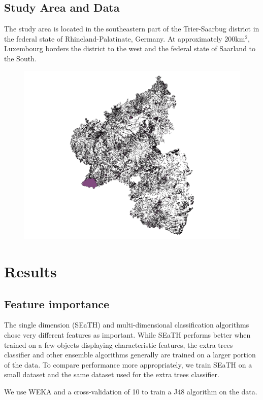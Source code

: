 \documentclass[a4paper,12pt]{article}
\begin{document}
\subsection{Study Area and Data}
The study area is located in the southeastern part of the Trier-Saarbug district
in the federal state of Rhineland-Palatinate, Germany. At approximately
200km$^{2}$, Luxembourg borders the district to the west and the federal state of Saarland to the South.
\begin{figure}
	\includegraphics[width=\textwidth]{diagrams/study_area_small.png}
\end{figure}

\section{Results}
\subsection{Feature importance}
The single dimension (SEaTH) and multi-dimensional classification
algorithms chose very different features as important. While SEaTH performs
better when trained on a few objects displaying characteristic
features\cite{Nussbaum2006}, the extra trees classifier and other ensemble
algorithms generally are trained on a larger portion of the data. To compare
performance more appropriately, we train SEaTH on a small dataset and the same
dataset used for the extra trees classifier.


We use WEKA and a cross-validation of 10 to train a J48 algorithm on the data.
\end{document}
